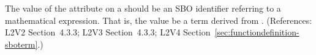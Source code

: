 The value of the  attribute on a \FunctionDefinition should be an
SBO identifier referring to a mathematical expression.  That is, the value
 be a term derived from \sbomathformula.  (References: L2V2 Section~4.3.3;
L2V3 Section~4.3.3; L2V4 Section~\ref{sec:functiondefinition-sboterm}.)

